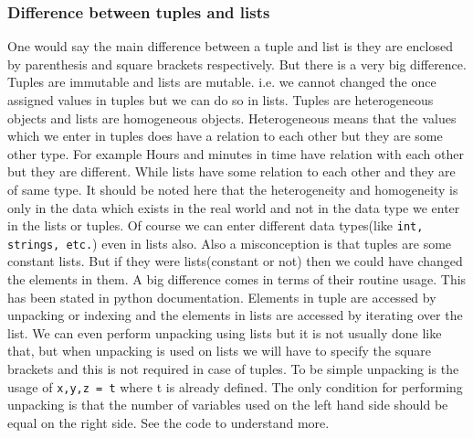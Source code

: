 \documentclass[12pt,a4paper]{article}
\begin{document}
\subsubsection{Difference between tuples and lists}
One would say the main difference between a tuple and list is they are enclosed by parenthesis and square brackets respectively. But there is a very big difference. Tuples are immutable and lists are mutable. i.e. we cannot changed the once assigned values in tuples but we can do so in lists. Tuples are heterogeneous objects and lists are homogeneous objects. Heterogeneous means that the values which we enter in tuples does have a relation to each other but they are some other type. For example Hours and minutes in time have relation with each other but they are different. While lists have some relation to each other and they are of same type. It should be noted here that the heterogeneity and homogeneity is only in the data which exists in the real world and not in the data type we enter in the lists or tuples. Of course we can enter different data types(like \texttt{int, strings, etc.}) even in lists also. Also a misconception is that tuples are some constant lists. But if they were lists(constant or not) then we could have changed the elements in them. A big difference comes in terms of their routine usage. This has been stated in python documentation. Elements in tuple are accessed by unpacking or indexing and the elements in lists are accessed by iterating over the list. We can even perform unpacking using lists but it is not usually done like that, but when unpacking is used on lists we will have to specify the square brackets and this is not required in case of tuples. To be simple unpacking is the usage of \texttt{x,y,z = t} where t is already defined. The only condition for performing unpacking is that the number of variables used on the left hand side should be equal on the right side. See the code to understand more.
\end{document}

